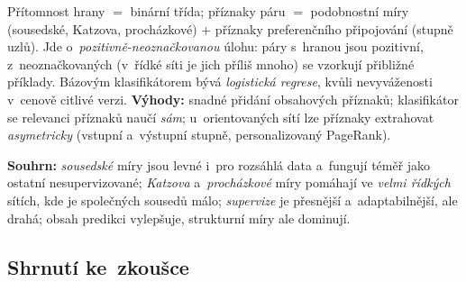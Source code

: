 \documentclass[11pt,a4paper]{article}
\theoremstyle{definition}
\begin{document}
\begin{defbox}
Přítomnost hrany $=$ binární třída; příznaky páru $=$ podobnostní míry (sousedské, Katzova,
procházkové) $+$ příznaky preferenčního připojování (stupně uzlů). Jde
o~\emph{pozitivně-neoznačkovanou} úlohu: páry s~hranou jsou pozitivní, z~neoznačkovaných
(v~řídké síti je jich příliš mnoho) se vzorkují přibližné  příklady. Bázovým
klasifikátorem bývá \emph{logistická regrese}, kvůli nevyváženosti v~cenově citlivé verzi.
\textbf{Výhody:} snadné přidání obsahových příznaků; klasifikátor se relevanci příznaků naučí
\emph{sám}; u~orientovaných sítí lze příznaky extrahovat \emph{asymetricky} (vstupní
a~výstupní stupně, personalizovaný PageRank).
\end{defbox}

\textbf{Souhrn:} \emph{sousedské} míry jsou levné i~pro rozsáhlá data a~fungují téměř jako
ostatní nesupervizované; \emph{Katzova} a~\emph{procházkové} míry pomáhají ve \emph{velmi
řídkých} sítích, kde je společných sousedů málo; \emph{supervize} je přesnější
a~adaptabilnější, ale drahá; obsah predikci vylepšuje, strukturní míry ale dominují.

\subsection{Shrnutí ke~zkoušce}
\end{document}
